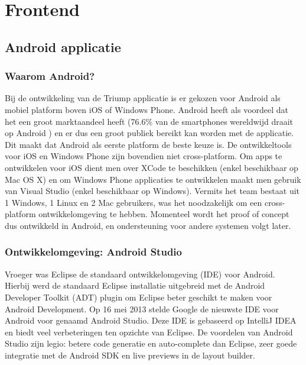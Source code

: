 \section{Frontend}
\subsection{Android applicatie}
\subsubsection{Waarom Android?}

Bij de ontwikkeling van de Triump applicatie is er gekozen voor Android als mobiel platform boven iOS of Windows Phone. Android heeft als voordeel dat het een groot marktaandeel heeft (76.6\% van de smartphones wereldwijd draait op Android \cite{marketshare}) en er dus een groot publiek bereikt kan worden met de applicatie. Dit maakt dat Android als eerste platform de beste keuze is. De ontwikkeltools voor iOS en Windows Phone zijn bovendien niet cross-platform. Om apps te ontwikkelen voor iOS dient men over XCode te beschikken (enkel beschikbaar op Mac OS X) en om Windows Phone applicaties te ontwikkelen maakt men gebruik van Visual Studio (enkel beschikbaar op Windows). Vermits het team bestaat uit 1 Windows, 1 Linux en 2 Mac gebruikers, was het noodzakelijk om een cross-platform ontwikkelomgeving te hebben.
Momenteel wordt het proof of concept dus ontwikkeld in Android, en ondersteuning voor andere systemen volgt later.
\subsubsection{Ontwikkelomgeving: Android Studio}
Vroeger was Eclipse de standaard ontwikkelomgeving (IDE) voor Android. Hierbij werd de standaard Eclipse installatie uitgebreid met de Android Developer Toolkit (ADT) plugin om Eclipse beter geschikt te maken voor Android Development. Op 16 mei 2013 stelde Google de nieuwste IDE voor Android voor genaamd Android Studio. Deze IDE is gebaseerd op IntelliJ IDEA en biedt veel verbeteringen ten opzichte van Eclipse. 
De voordelen van Android Studio zijn legio: betere code generatie en auto-complete dan Eclipse, zeer goede integratie met de Android SDK en live previews in de layout builder. 


